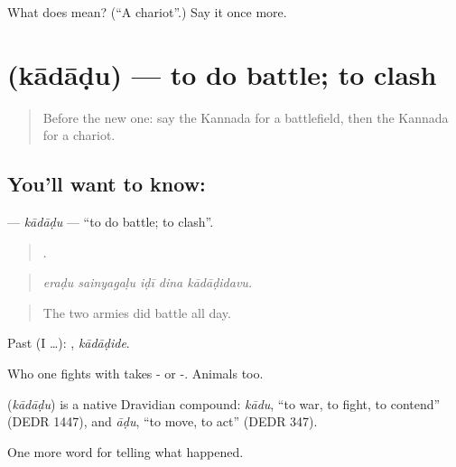 \begin{tcolorbox}[breakable,colback=teal!4,colframe=teal!35!black,title={Before you move on}]
What does  mean? (\textquotedblleft{}A chariot\textquotedblright{}.) Say it once more.
\end{tcolorbox}
\section[\texorpdfstring{\kn{ಕಾದಾಡು} (kādāḍu)}{ಕಾದಾಡು (kādāḍu)}]{ (kādāḍu) — to do battle; to clash}

\label{lesson:KA-C344-kadadu}



\begin{quote}
Before the new one: say the Kannada for a battlefield, then the Kannada for a chariot.
\end{quote}

\subsection*{You'll want to know: }
\textbf{} — \emph{kādāḍu} — \textquotedblleft{}to do battle; to clash\textquotedblright{}.

\begin{quote}
    .
\end{quote}

\begin{quote}
\emph{eraḍu sainyagaḷu iḍī dina kādāḍidavu.}
\end{quote}

\begin{quote}
The two armies did battle all day.
\end{quote}

Past (I …): , \emph{kādāḍide}.

Who one fights with takes - or -. Animals  too.

\begin{cousinweb}
\textbf{} (\emph{kādāḍu}) is a native Dravidian compound: \emph{kādu}, \textquotedblleft{}to war, to fight, to contend\textquotedblright{} (DEDR 1447), and \emph{āḍu}, \textquotedblleft{}to move, to act\textquotedblright{} (DEDR 347).
\end{cousinweb}

\begin{grammarlens}[title={What you've built}]
One more word for telling what happened.
\end{grammarlens}

